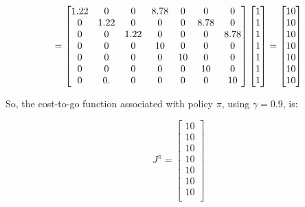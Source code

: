 \documentclass{article}
\begin{document}
\begin{equation}
    \notag
    = 
    \begin{bmatrix}
        1.22 & 0 & 0 & 8.78 & 0 & 0 & 0 \\ 
        0 & 1.22 & 0 & 0 & 0 & 8.78 & 0 \\ 
        0 & 0 & 1.22 & 0 & 0 & 0 & 8.78 \\
        0 & 0 & 0 & 10 & 0 & 0 & 0 \\  
        0 & 0 & 0 & 0 & 10 & 0 & 0 \\ 
        0 & 0 & 0 & 0 & 0 & 10 & 0 \\  
        0 & 0.& 0 & 0 & 0 & 0 & 10 \\
    \end{bmatrix}
    \begin{bmatrix}
        1 \\
        1 \\
        1 \\
        1 \\
        1 \\
        1 \\
        1 \\
    \end{bmatrix} = 
    \begin{bmatrix}
        10 \\
        10 \\
        10 \\
        10 \\
        10 \\
        10 \\
        10 \\
    \end{bmatrix}
\end{equation}

\medskip

So, the cost-to-go function associated with policy $\pi$, using $\gamma = 0.9$, is: 

\begin{equation}
    J^\pi = 
    \begin{bmatrix}
        10 \\
        10 \\
        10 \\
        10 \\
        10 \\
        10 \\
        10 \\
    \end{bmatrix}
\end{equation}
\end{document}
